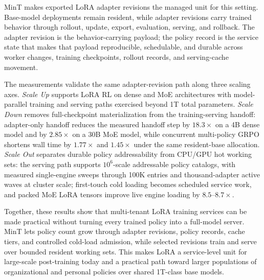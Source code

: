 \documentclass{llmxive}
\begin{document}
MinT makes exported LoRA adapter revisions the managed unit for this setting. Base-model deployments remain resident, while adapter revisions carry trained behavior through rollout, update, export, evaluation, serving, and rollback. The adapter revision is the behavior-carrying payload; the policy record is the service state that makes that payload reproducible, schedulable, and durable across worker changes, training checkpoints, rollout records, and serving-cache movement.

The measurements validate the same adapter-revision path along three scaling axes. \textit{Scale Up} supports LoRA RL on dense and MoE architectures with model-parallel training and serving paths exercised beyond 1T total parameters. \textit{Scale Down} removes full-checkpoint materialization from the training-serving handoff: adapter-only handoff reduces the measured handoff step by $18.3\times$ on a 4B dense model and by $2.85\times$ on a 30B MoE model, while concurrent multi-policy GRPO shortens wall time by $1.77\times$ and $1.45\times$ under the same resident-base allocation. \textit{Scale Out} separates durable policy addressability from CPU/GPU hot working sets: the serving path supports $10^6$-scale addressable policy catalogs, with measured single-engine sweeps through 100K entries and thousand-adapter active waves at cluster scale; first-touch cold loading becomes scheduled service work, and packed MoE LoRA tensors improve live engine loading by $8.5$--$8.7\times$.

Together, these results show that multi-tenant LoRA training services can be made practical without turning every trained policy into a full-model server. MinT lets policy count grow through adapter revisions, policy records, cache tiers, and controlled cold-load admission, while selected revisions train and serve over bounded resident working sets. This makes LoRA a service-level unit for large-scale post-training today and a practical path toward larger populations of organizational and personal policies over shared 1T-class base models.



\end{document}
